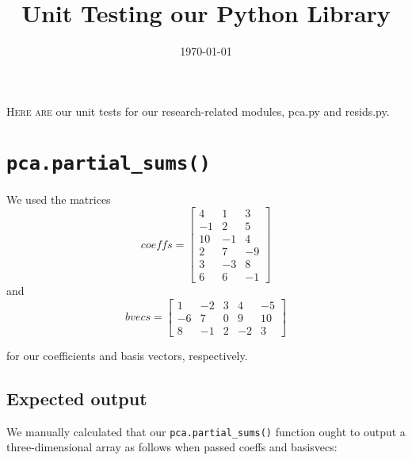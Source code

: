 \documentclass{article}
\begin{document}
\title{Unit Testing our Python Library}
\date{\today}
\maketitle

\textsc{Here are} our unit tests for our research-related modules,
pca.py and resids.py.

\tableofcontents

\newpage

\section{\texttt{pca.partial\_sums()}}
\label{sec:partialsums}

We used the matrices
\[coeffs = \left[ \begin{array}{ccc}
4 & 1 & 3 \\
-1 & 2 & 5 \\
10 & -1 & 4 \\
2 & 7 & -9 \\
3 & -3 & 8 \\
6 & 6 & -1
\end{array} \right] \]
and
\[bvecs = \left[ \begin{array}{ccccc}
1 & -2 & 3 & 4 & -5 \\
-6 & 7 & 0 & 9 & 10 \\
8 & -1 & 2 & -2 & 3
\end{array} \right] \]

for our coefficients and basis vectors, respectively.

\subsection{Expected output}
\label{sec:manual}

We manually calculated that our \verb|pca.partial_sums()| function
ought to output a three-dimensional array as follows when passed
coeffs and basisvecs:
\end{document}

